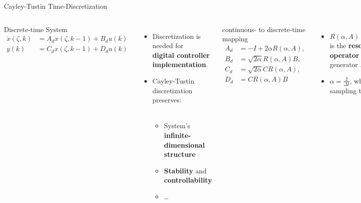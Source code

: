 \documentclass[8pt]{beamer}
\begin{document}
\begin{frame}{Cayley-Tustin Time-Discretization}

\begin{columns}[c]

\begin{block}{Discrete-time System}
\begin{equation} \label{eq:state_space_dt}
\begin{aligned}
    \dot{x}(\zeta, k) &= A_d x(\zeta, k{-}1) + B_d u(k) \\
    y(k) &= C_d x(\zeta, k{-}1) + D_d u(k)
\end{aligned}
\end{equation}
\end{block}
    
\begin{itemize}
    \item Discretization is needed for \\\textbf{digital controller implementation}.
    \item Cayley-Tustin discretization preserves:\\ \,
    \begin{itemize}\setlength\itemsep{4pt}
        \item System's \textbf{infinite-dimensional structure}
        \item \textbf{Stability} and \textbf{controllability}
        \item \dots
    \end{itemize}
\end{itemize}



\begin{block}{continuous- to discrete-time mapping}
\vspace{1mm}
\begin{equation} \label{eq:ct_to_dt}
\begin{aligned}
    A_d &= - I + 2\alpha {R}(\alpha, A), \\
    B_d &= \sqrt{2\alpha} {R}(\alpha, A) B, \\
    C_d &= \sqrt{2\alpha} C {R}(\alpha, A), \\
    D_d &= C {R}(\alpha, A) B
\end{aligned}
\end{equation}
\vspace{1mm}
\end{block}
\vspace{2mm}
\begin{itemize}
    \item ${R}(\alpha, A) := \left[ \alpha I - A \right]^{-1}$ is the \textbf{resolvent operator} of system generator $A$.
    \item \( \alpha = \frac{2}{\Delta t} \), where \( \Delta t \) is the sampling time.
\end{itemize}
    
\end{columns}
\end{frame}
\end{document}
